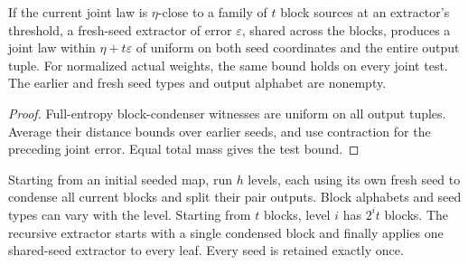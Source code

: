 \begin{theorem}
  \label{thm:lowerbounds-algebraic-retained-block-extraction}
  \leanok
  If the current joint law is $\eta$-close to a family of $t$ block sources
  at an extractor's threshold, a fresh-seed extractor of error
  $\varepsilon$, shared across the blocks, produces a joint law within
  $\eta+t\varepsilon$ of uniform on both seed coordinates and the entire
  output tuple. For normalized actual weights, the same bound holds on
  every joint test. The earlier and fresh seed types and output alphabet
  are nonempty.
\end{theorem}
\begin{proof}
  \leanok
  Full-entropy block-condenser witnesses are uniform on all output tuples.
  Average their distance bounds over earlier seeds, and use contraction
  for the preceding joint error. Equal total mass gives the test bound.
\end{proof}

\begin{definition}
  \label{def:lowerbounds-algebraic-recursive-block-map}
  \leanok
  Starting from an initial seeded map, run $h$ levels, each using its own
  fresh seed to condense all current blocks and split their pair outputs.
  Block alphabets and seed types can vary with the level. Starting from
  $t$ blocks, level $i$ has $2^it$ blocks. The recursive extractor starts
  with a single condensed block and finally applies one shared-seed
  extractor to every leaf. Every seed is retained exactly once.
\end{definition}

